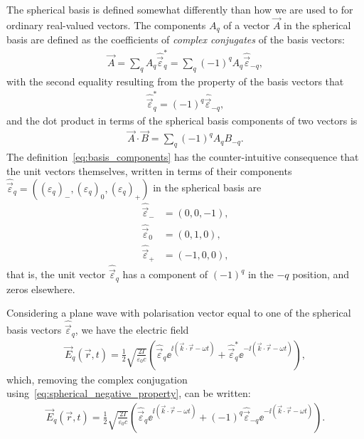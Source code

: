 The spherical basis is defined somewhat differently than how we are used to for ordinary real-valued vectors. The components $A_q$ of a vector $\vec A$ in the spherical basis are defined as the coefficients of \emph{complex conjugates} of the basis vectors:
\begin{align}\label{eq:basis_components}
\vec A = \sum_q A_q \hat{\vec\varepsilon}_q^* = \sum_q (-1)^q A_q \hat{\vec\varepsilon}_{-q},
\end{align}
with the second equality resulting from the property of the basis vectors that
\begin{align}\label{eq:spherical_negative_property}
\hat{\vec\varepsilon}_q^* = (-1)^q\hat{\vec\varepsilon}_{-q},
\end{align}
and the dot product in terms of the spherical basis components of two vectors is
\begin{align}\label{eq:spherical_dot_product}
\vec A \cdot \vec B = \sum_q (-1)^q A_q B_{-q}.
\end{align}
The definition~\eqref{eq:basis_components} has the counter-intuitive consequence that the unit vectors themselves, written in terms of their components $\hat{\vec\varepsilon}_q = \left((\varepsilon_q)_{-}, (\varepsilon_q)_{0}, (\varepsilon_q)_{+}\right)$ in the spherical basis are
\begin{align}
\hat{\vec\varepsilon}_{-} &= (0, 0, -1),\\
\hat{\vec\varepsilon}_0 &= (0, 1, 0),\\
\hat{\vec\varepsilon}_{+} &= (-1, 0, 0),
\end{align}
that is, the unit vector $\hat{\vec\varepsilon}_{q}$ has a component of $(-1)^q$ in the $-q$ position, and zeros elsewhere.

Considering a plane wave with polarisation vector equal to one of the spherical basis vectors $\hat{\vec\varepsilon}_q$, we have the electric field
\begin{align}\label{eq:complex_plane_wave_q}
\vec E_q(\vec r, t) = \frac12\sqrt{\frac{2I}{\varepsilon_0 c}}
\left(\hat{\vec\varepsilon}_q \ee^{\ii(\vec k \cdot \vec r - \omega t)}
+ \hat{\vec\varepsilon}_q^* \ee^{-\ii(\vec k \cdot \vec r - \omega t)} \right),
\end{align}
which, removing the complex conjugation using~\eqref{eq:spherical_negative_property}, can be written:
\begin{align}\label{eq:complex_plane_wave_q_noconj}
\vec E_q(\vec r, t) = \frac12\sqrt{\frac{2I}{\varepsilon_0 c}}
\left(\hat{\vec\varepsilon}_q \ee^{\ii(\vec k \cdot \vec r - \omega t)}
+ (-1)^q\hat{\vec\varepsilon}_{-q} \ee^{-\ii(\vec k \cdot \vec r - \omega t)} \right).
\end{align}

